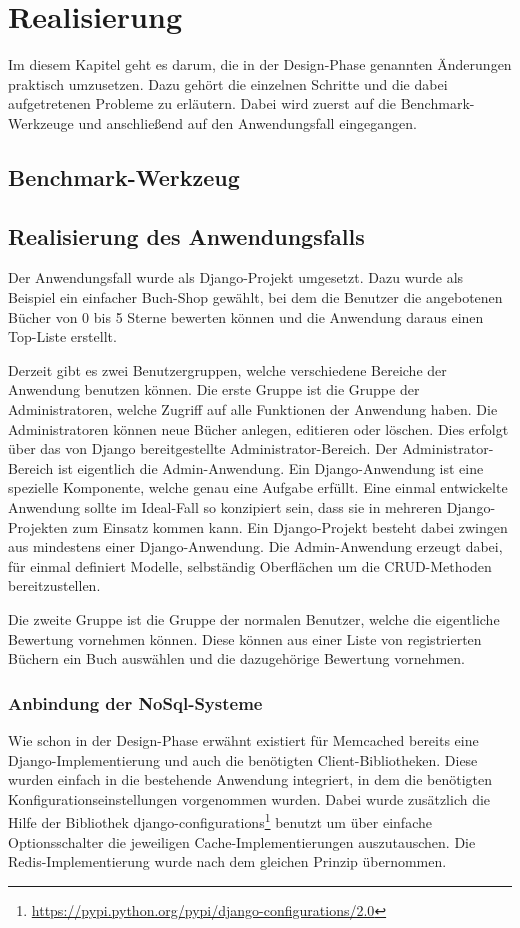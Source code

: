 \chapter{Realisierung}
Im diesem Kapitel geht es darum, die in der Design-Phase genannten Änderungen
praktisch umzusetzen. Dazu gehört die einzelnen Schritte und die dabei
aufgetretenen Probleme zu erläutern. Dabei wird zuerst auf die
Benchmark-Werkzeuge und anschließend auf den Anwendungsfall eingegangen.

\section{Benchmark-Werkzeug}

\section{Realisierung des Anwendungsfalls}
Der Anwendungsfall wurde als Django-Projekt umgesetzt. Dazu wurde als Beispiel
ein einfacher Buch-Shop gewählt, bei dem die Benutzer die angebotenen Bücher von
0 bis 5 Sterne bewerten können und die Anwendung daraus einen Top-Liste erstellt.

Derzeit gibt es zwei Benutzergruppen, welche verschiedene Bereiche der Anwendung
benutzen können. Die erste Gruppe ist die Gruppe der Administratoren, welche
Zugriff auf alle Funktionen der Anwendung haben. Die Administratoren können neue
Bücher anlegen, editieren oder löschen. Dies erfolgt über das von Django
bereitgestellte Administrator-Bereich. Der Administrator-Bereich ist eigentlich
die Admin-Anwendung. Ein Django-Anwendung ist eine spezielle Komponente, welche
genau eine Aufgabe erfüllt. Eine einmal entwickelte Anwendung sollte im
Ideal-Fall so konzipiert sein, dass sie in mehreren Django-Projekten zum Einsatz
kommen kann. Ein Django-Projekt besteht dabei zwingen aus mindestens einer
Django-Anwendung. Die Admin-Anwendung erzeugt dabei, für einmal definiert
Modelle, selbständig Oberflächen um die CRUD-Methoden bereitzustellen.

Die zweite Gruppe ist die Gruppe der normalen Benutzer, welche die eigentliche
Bewertung vornehmen können. Diese können aus einer Liste von registrierten
Büchern ein Buch auswählen und die dazugehörige Bewertung vornehmen.

\subsection{Anbindung der NoSql-Systeme}
Wie schon in der Design-Phase erwähnt existiert für Memcached bereits eine
Django-Implementierung und auch die benötigten Client-Bibliotheken. Diese wurden
einfach in die bestehende Anwendung integriert, in dem die benötigten
Konfigurationseinstellungen vorgenommen wurden. Dabei wurde zusätzlich die Hilfe
der Bibliothek django-configurations\footnote{\url{https://pypi.python.org/pypi/django-configurations/2.0}}
benutzt um über einfache Optionsschalter die jeweiligen Cache-Implementierungen
auszutauschen. Die Redis-Implementierung wurde nach dem gleichen Prinzip
übernommen.

